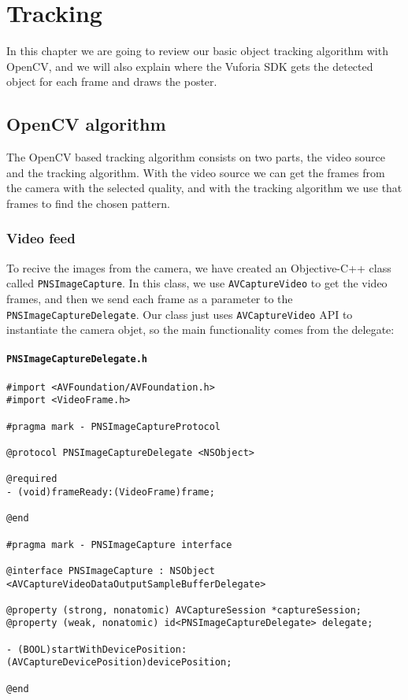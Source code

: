 \chapter{Tracking}
In this chapter we are going to review our basic object tracking algorithm with
OpenCV, and we will also explain where the Vuforia SDK gets the detected object
for each frame and draws the poster.

\section{OpenCV algorithm}
The OpenCV based tracking algorithm consists on two parts, the video source and
the tracking algorithm. With the video source we can get the frames from the
camera with the selected quality, and with the tracking algorithm we use that
frames to find the chosen pattern. 

\subsection{Video feed}
To recive the images from the camera, we have created an Objective-C++ class
called \texttt{PNS\-Image\-Capture}. In this class, we use
\texttt{AV\-Capture\-Video} to get the video frames, and then we send each
frame as a parameter to the \texttt{PNS\-Image\-Capture\-Delegate}. Our class
just uses \texttt{AV\-Capture\-Video} API to instantiate the camera objet, so
the main functionality comes from the delegate:

\subsubsection*{\texttt{PNSImageCaptureDelegate.h}}
\begin{verbatim}
#import <AVFoundation/AVFoundation.h>
#import <VideoFrame.h>

#pragma mark - PNSImageCaptureProtocol

@protocol PNSImageCaptureDelegate <NSObject>

@required
- (void)frameReady:(VideoFrame)frame;

@end

#pragma mark - PNSImageCapture interface

@interface PNSImageCapture : NSObject
<AVCaptureVideoDataOutputSampleBufferDelegate>

@property (strong, nonatomic) AVCaptureSession *captureSession;
@property (weak, nonatomic) id<PNSImageCaptureDelegate> delegate;

- (BOOL)startWithDevicePosition:(AVCaptureDevicePosition)devicePosition;

@end
\end{verbatim}

